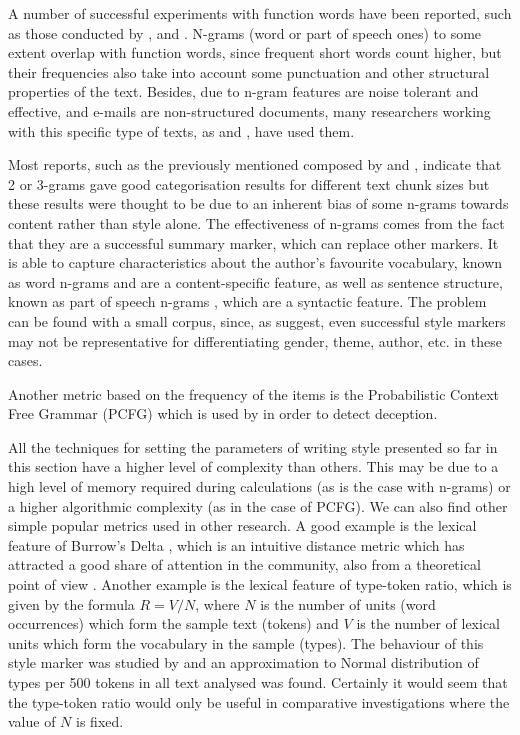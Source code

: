 A number of successful experiments with function words have been reported, such as those conducted by \cite{craig1999authorial}, \cite{koppel2006feature} and \cite{de2001mining}. N-grams (word or part of speech ones) to some extent overlap with function words, since frequent short words count higher, but their frequencies also take into account some punctuation and other structural properties of the text. Besides, due to n-gram features are noise tolerant and effective, and e-mails are non-structured documents, many researchers working with this specific type of texts, as \cite{brocardo2013authorship} and \cite{corney2001identifying}, have used them.

Most reports, such as the previously mentioned composed by \cite{kjell1994discrimination} and \cite{corney2001identifying}, indicate that 2 or 3-grams gave good categorisation results for different text chunk sizes but these results were thought to be due to an inherent bias of some n-grams towards content rather than style alone. The effectiveness of n-grams comes from the fact that they are a successful summary marker, which can replace other markers. It is able to capture characteristics about the author's favourite vocabulary, known as word n-grams \citep{diederich2003authorship} and are a content-specific feature, as well as sentence structure, known as part of speech n-grams \citep{baayen1996outside, argamon1998routing}, which are a syntactic feature. The problem can be found with a small corpus, since, as \cite{baayen2000back} suggest, even successful style markers may not be representative for differentiating gender, theme, author, etc. in these cases.

Another metric based on the frequency of the items is the Probabilistic Context Free Grammar (PCFG) which is used by \cite{cfgstylo} in order to detect deception.

All the techniques for setting the parameters of writing style presented so far in this section have a higher level of complexity than others. This may be due to a high level of memory required during calculations (as is the case with n-grams) or a higher algorithmic complexity (as in the case of PCFG). We can also find other simple popular metrics used in other research. A good example is the lexical feature of Burrow's Delta \citep{burrows2002delta}, which is an intuitive distance metric which has attracted a good share of attention in the community, also from a theoretical point of view \citep{argamon2008interpreting, hoover2004testing, hoover2004delta}. Another example is the lexical feature of type-token ratio, which is given by the formula $R=V/N$, where $N$ is the number of units (word occurrences) which form the sample text (tokens) and $V$ is the number of lexical units which form the vocabulary in the sample (types). The behaviour of this style marker was studied by \cite{kjetsaa1979and} and an approximation to Normal distribution of types per 500 tokens in all text analysed was found. Certainly it would seem that the type-token ratio would only be useful in comparative investigations where the value of $N$ is fixed.

